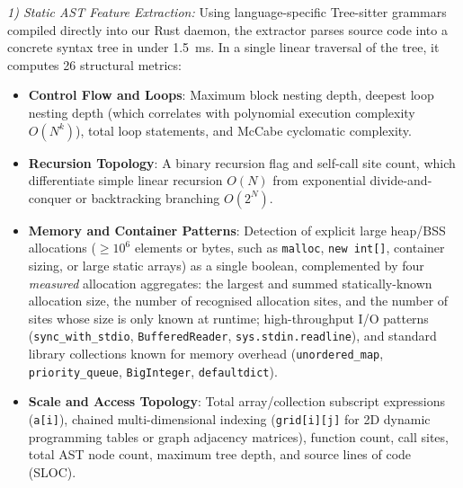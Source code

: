 \documentclass[conference]{IEEEtran}
\begin{document}
\textit{1) Static AST Feature Extraction:} Using language-specific Tree-sitter grammars compiled directly into our Rust daemon, the extractor parses source code into a concrete syntax tree in under 1.5~ms. In a single linear traversal of the tree, it computes 26 structural metrics:
\begin{itemize}
    \item \textbf{Control Flow and Loops}: Maximum block nesting depth, deepest loop nesting depth (which correlates with polynomial execution complexity $O(N^k)$), total loop statements, and McCabe cyclomatic complexity.
    \item \textbf{Recursion Topology}: A binary recursion flag and self-call site count, which differentiate simple linear recursion $O(N)$ from exponential divide-and-conquer or backtracking branching $O(2^N)$.
    \item \textbf{Memory and Container Patterns}: Detection of explicit large heap/BSS allocations ($\ge 10^6$ elements or bytes, such as \texttt{malloc}, \texttt{new int[]}, container sizing, or large static arrays) as a single boolean, complemented by four \emph{measured} allocation aggregates: the largest and summed statically-known allocation size, the number of recognised allocation sites, and the number of sites whose size is only known at runtime; high-throughput I/O patterns (\texttt{sync\_with\_stdio}, \texttt{BufferedReader}, \texttt{sys.stdin.readline}), and standard library collections known for memory overhead (\texttt{unordered\_map}, \texttt{priority\_queue}, \texttt{BigInteger}, \texttt{defaultdict}).
    \item \textbf{Scale and Access Topology}: Total array/collection subscript expressions (\texttt{a[i]}), chained multi-dimensional indexing (\texttt{grid[i][j]} for 2D dynamic programming tables or graph adjacency matrices), function count, call sites, total AST node count, maximum tree depth, and source lines of code (SLOC).
\end{itemize}
\end{document}
